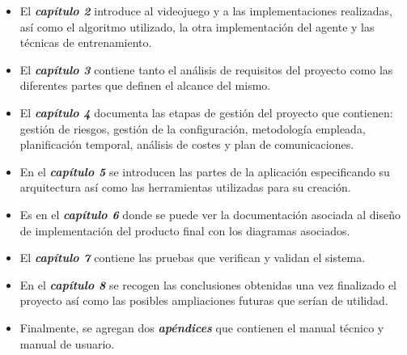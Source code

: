 \begin{itemize}
	\item El \textbf{\textit{capítulo 2}} introduce al videojuego y a las implementaciones realizadas, así como el algoritmo utilizado, la otra implementación del agente y las técnicas de entrenamiento.
	\item El \textbf{\textit{capítulo 3}} contiene tanto el análisis de requisitos del proyecto como las diferentes partes que definen el alcance del mismo.
	\item El \textbf{\textit{capítulo 4}} documenta las etapas de gestión del proyecto que contienen: gestión de riesgos, gestión de la configuración, metodología empleada, planificación temporal, análisis de costes y plan de comunicaciones.
	\item En el \textbf{\textit{capítulo 5}} se introducen las partes de la aplicación especificando su arquitectura así como las herramientas utilizadas para su creación.
	\item Es en el \textbf{\textit{capítulo 6}} donde se puede ver la documentación asociada al diseño de implementación del producto final con los diagramas asociados.
	\item El \textbf{\textit{capítulo 7}} contiene las pruebas que verifican y validan el sistema.
	\item En el \textbf{\textit{capítulo 8}} se recogen las conclusiones obtenidas una vez finalizado el proyecto así como las posibles ampliaciones futuras que serían de utilidad.
	\item Finalmente, se agregan dos \textbf{\textit{apéndices}} que contienen el manual técnico y manual de usuario.
\end{itemize}




